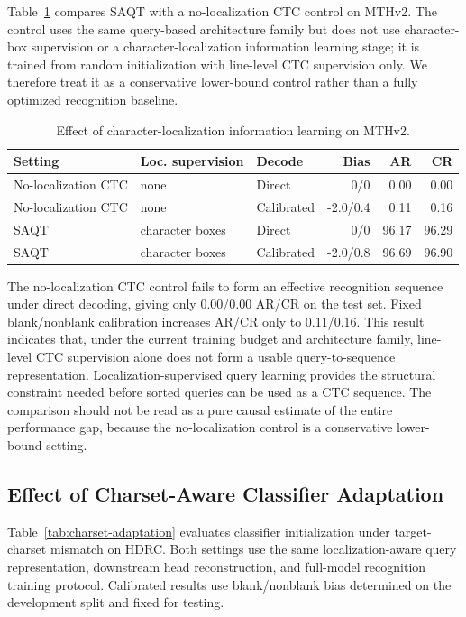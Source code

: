 Table~\ref{tab:localization-learning} compares SAQT with a no-localization CTC control on MTHv2. The control uses the same query-based architecture family but does not use character-box supervision or a character-localization information learning stage; it is trained from random initialization with line-level CTC supervision only. We therefore treat it as a conservative lower-bound control rather than a fully optimized recognition baseline.

\begin{table}[t]
\centering
\caption{Effect of character-localization information learning on MTHv2.}
\label{tab:localization-learning}
\begin{tabular}{lllrrr}
\toprule
Setting & Loc. supervision & Decode & Bias & AR & CR \\
\midrule
No-localization CTC & none & Direct & 0/0 & 0.00 & 0.00 \\
No-localization CTC & none & Calibrated & -2.0/0.4 & 0.11 & 0.16 \\
SAQT & character boxes & Direct & 0/0 & 96.17 & 96.29 \\
SAQT & character boxes & Calibrated & -2.0/0.8 & 96.69 & 96.90 \\
\bottomrule
\end{tabular}
\end{table}

The no-localization CTC control fails to form an effective recognition sequence under direct decoding, giving only 0.00/0.00 AR/CR on the test set. Fixed blank/nonblank calibration increases AR/CR only to 0.11/0.16. This result indicates that, under the current training budget and architecture family, line-level CTC supervision alone does not form a usable query-to-sequence representation. Localization-supervised query learning provides the structural constraint needed before sorted queries can be used as a CTC sequence. The comparison should not be read as a pure causal estimate of the entire performance gap, because the no-localization control is a conservative lower-bound setting.

\subsection{Effect of Charset-Aware Classifier Adaptation}

Table~\ref{tab:charset-adaptation} evaluates classifier initialization under target-charset mismatch on HDRC. Both settings use the same localization-aware query representation, downstream head reconstruction, and full-model recognition training protocol. Calibrated results use blank/nonblank bias determined on the development split and fixed for testing.

